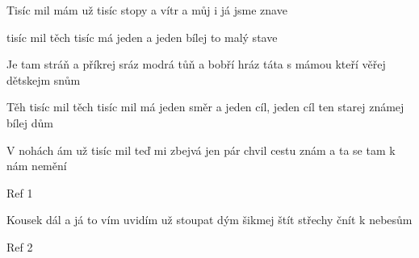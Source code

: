 \begin{TEXT}{Tisíc mil}
\SLOKA {} mám už tisíc 
stopy  a vítr 
a můj  i já jsme  znave

\REFREN {} tisíc mil těch tisíc 
má jeden  a jeden 
bílej  to malý  stave

\SLOKA Je tam stráň a příkrej sráz
modrá tůň a bobří hráz
táta s mámou kteří věřej dětskejm snům

\REFREN Těh tisíc mil těch tisíc mil
má jeden směr a jeden cíl,
jeden cíl ten starej známej bílej dům

\SLOKA V nohách ám už tisíc mil
teď mi zbejvá jen pár chvil
cestu znám a ta se tam k nám nemění

\REFREN Ref 1

\SLOKA Kousek dál a já to vím
uvidím už stoupat dým
šikmej štít střechy čnít k nebesům 

\REFREN Ref 2
\end{TEXT}